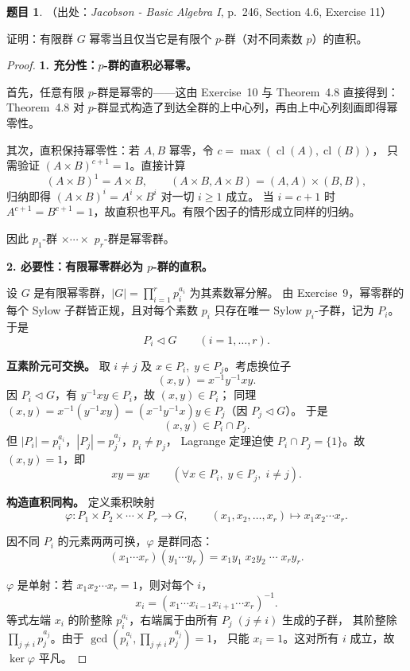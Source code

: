 \documentclass[a4paper]{ctexart}
\theoremstyle{definition}
\newtheorem{example}{题目}[section]
\theoremstyle{analysis}
\theoremstyle{plain}
\begin{document}
\begin{example}
（出处：\textit{Jacobson - Basic Algebra I}, p.~246, Section 4.6, Exercise 11）

证明：有限群 \(G\) 幂零当且仅当它是有限个 \(p\)-群（对不同素数 \(p\)）的直积。

\begin{proof}
\textbf{1. 充分性：\(p\)-群的直积必幂零。}

首先，任意有限 \(p\)-群是幂零的——这由 Exercise~10 与 Theorem~4.8 直接得到：
Theorem~4.8 对 \(p\)-群显式构造了到达全群的上中心列，再由上中心列刻画即得幂零性。

其次，直积保持幂零性：若 \(A,B\) 幂零，令 \(c=\max(\operatorname{cl}(A),\operatorname{cl}(B))\)，
只需验证 \((A\times B)^{c+1}=1\)。直接计算
\[
  (A\times B)^1=A\times B,\qquad
  (A\times B,A\times B)=(A,A)\times(B,B),
\]
归纳即得 \((A\times B)^i=A^i\times B^i\) 对一切 \(i\ge 1\) 成立。
当 \(i=c+1\) 时 \(A^{c+1}=B^{c+1}=1\)，故直积也平凡。有限个因子的情形成立同样的归纳。

因此 \(p_1\)-群 \(\times\cdots\times\) \(p_r\)-群是幂零群。

\textbf{2. 必要性：有限幂零群必为 \(p\)-群的直积。}

设 \(G\) 是有限幂零群，\(|G|=\prod_{i=1}^r p_i^{a_i}\) 为其素数幂分解。
由 Exercise~9，幂零群的每个 Sylow 子群皆正规，且对每个素数 \(p_i\) 只存在唯一
Sylow \(p_i\)-子群，记为 \(P_i\)。于是
\[
  P_i\triangleleft G\qquad (i=1,\dots,r).
\]

\textbf{互素阶元可交换。} 取 \(i\neq j\) 及 \(x\in P_i,\;y\in P_j\)。考虑换位子
\[
  (x,y)=x^{-1}y^{-1}xy.
\]
因 \(P_i\triangleleft G\)，有 \(y^{-1}xy\in P_i\)，故 \((x,y)\in P_i\)；
同理 \((x,y)=x^{-1}(y^{-1}xy)=(x^{-1}y^{-1}x)y\in P_j\)（因 \(P_j\triangleleft G\)）。
于是
\[
  (x,y)\in P_i\cap P_j.
\]
但 \(|P_i|=p_i^{a_i}\)，\(|P_j|=p_j^{a_j}\)，\(p_i\neq p_j\)，
Lagrange 定理迫使 \(P_i\cap P_j=\{1\}\)。故 \((x,y)=1\)，即
\[
  xy=yx\qquad(\forall x\in P_i,\;y\in P_j,\;i\neq j).
\]

\textbf{构造直积同构。} 定义乘积映射
\[
  \varphi:P_1\times P_2\times\cdots\times P_r\longrightarrow G,\qquad
  (x_1,x_2,\dots,x_r)\longmapsto x_1x_2\cdots x_r.
\]

因不同 \(P_i\) 的元素两两可换，\(\varphi\) 是群同态：
\[
  (x_1\cdots x_r)(y_1\cdots y_r)=x_1y_1\;x_2y_2\;\cdots\;x_ry_r.
\]

\(\varphi\) 是单射：若 \(x_1x_2\cdots x_r=1\)，则对每个 \(i\)，
\[
  x_i=(x_1\cdots x_{i-1}x_{i+1}\cdots x_r)^{-1}.
\]
等式左端 \(x_i\) 的阶整除 \(p_i^{a_i}\)，右端属于由所有 \(P_j\;(j\neq i)\) 生成的子群，
其阶整除 \(\prod_{j\neq i}p_j^{a_j}\)。由于 \(\gcd(p_i^{a_i},\prod_{j\neq i}p_j^{a_j})=1\)，
只能 \(x_i=1\)。这对所有 \(i\) 成立，故 \(\ker\varphi\) 平凡。


\end{proof}
\end{example}
\end{document}
